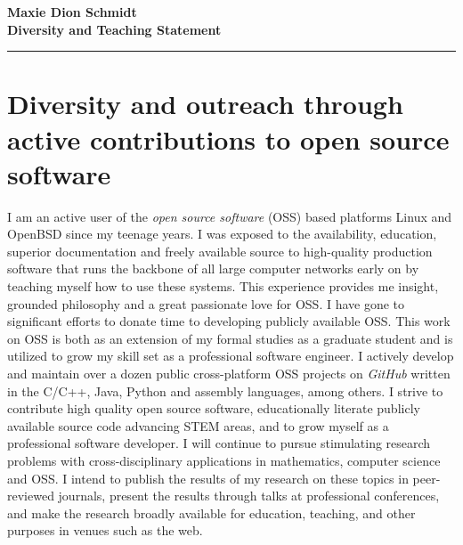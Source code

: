 \documentclass[10pt,reqno,letterpaper]{article}
\theoremstyle{plain}
\numberwithin{theorem}{section}
\theoremstyle{definition}
\begin{document}
\noindent 
{\bfseries\Large Maxie Dion Schmidt} \\[0.5ex]
{\bfseries\Large Diversity and Teaching Statement} \\ 
\hrule\medskip

\section{Diversity and outreach through active contributions to open source software} 

I am an active user of the \emph{open source software} (OSS) based 
platforms Linux and OpenBSD since my 
teenage years. I was exposed to the availability, education, superior documentation and 
freely available source to high-quality production software that runs the backbone of all large 
computer networks early on by teaching myself how to use these systems. This experience provides me 
insight, grounded philosophy and a great passionate love for OSS. I have gone to significant efforts to 
donate time to developing publicly available OSS. 
This work on OSS is both as an extension of my formal studies as 
a graduate student and is utilized to grow my skill set as a professional software engineer. 
I actively develop and maintain 
over a dozen public cross-platform OSS projects on \emph{GitHub} 
written in the C/C++, Java, Python and assembly languages, among others. 
I strive to contribute high quality open source software, educationally 
literate publicly available source code advancing STEM areas, and to grow myself as a 
professional software developer. 
I will continue to pursue stimulating research problems 
with cross-disciplinary applications in mathematics, computer science and OSS. I intend to 
publish the results of my research on these topics in peer-reviewed journals, present 
the results through talks at professional conferences, and make the research broadly 
available for education, teaching, and other purposes in venues such as the web.

\end{document}
